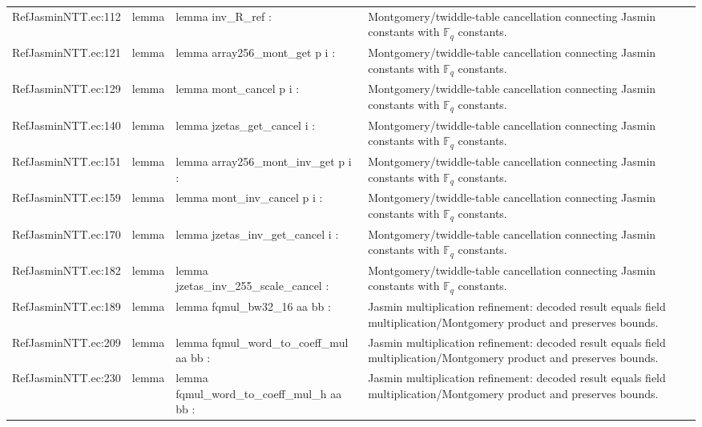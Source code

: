 \documentclass[10pt]{article}
\begin{document}
\begin{longtable}{L{0.11\textwidth}L{0.05\textwidth}L{0.38\textwidth}L{0.42\textwidth}}
RefJasminNTT.\allowbreak{}ec:\allowbreak{}112 & lemma & {\ttfamily\scriptsize lemma inv\_R\_ref :} & Montgomery/twiddle-table cancellation connecting Jasmin constants with $\mathbb F_q$ constants. \\
RefJasminNTT.\allowbreak{}ec:\allowbreak{}121 & lemma & {\ttfamily\scriptsize lemma array256\_mont\_get p i :} & Montgomery/twiddle-table cancellation connecting Jasmin constants with $\mathbb F_q$ constants. \\
RefJasminNTT.\allowbreak{}ec:\allowbreak{}129 & lemma & {\ttfamily\scriptsize lemma mont\_cancel p i :} & Montgomery/twiddle-table cancellation connecting Jasmin constants with $\mathbb F_q$ constants. \\
RefJasminNTT.\allowbreak{}ec:\allowbreak{}140 & lemma & {\ttfamily\scriptsize lemma jzetas\_get\_cancel i :} & Montgomery/twiddle-table cancellation connecting Jasmin constants with $\mathbb F_q$ constants. \\
RefJasminNTT.\allowbreak{}ec:\allowbreak{}151 & lemma & {\ttfamily\scriptsize lemma array256\_mont\_inv\_get p i :} & Montgomery/twiddle-table cancellation connecting Jasmin constants with $\mathbb F_q$ constants. \\
RefJasminNTT.\allowbreak{}ec:\allowbreak{}159 & lemma & {\ttfamily\scriptsize lemma mont\_inv\_cancel p i :} & Montgomery/twiddle-table cancellation connecting Jasmin constants with $\mathbb F_q$ constants. \\
RefJasminNTT.\allowbreak{}ec:\allowbreak{}170 & lemma & {\ttfamily\scriptsize lemma jzetas\_inv\_get\_cancel i :} & Montgomery/twiddle-table cancellation connecting Jasmin constants with $\mathbb F_q$ constants. \\
RefJasminNTT.\allowbreak{}ec:\allowbreak{}182 & lemma & {\ttfamily\scriptsize lemma jzetas\_inv\_255\_scale\_cancel :} & Montgomery/twiddle-table cancellation connecting Jasmin constants with $\mathbb F_q$ constants. \\
RefJasminNTT.\allowbreak{}ec:\allowbreak{}189 & lemma & {\ttfamily\scriptsize lemma fqmul\_bw32\_16 aa bb :} & Jasmin multiplication refinement: decoded result equals field multiplication/Montgomery product and preserves bounds. \\
RefJasminNTT.\allowbreak{}ec:\allowbreak{}209 & lemma & {\ttfamily\scriptsize lemma fqmul\_word\_to\_coeff\_mul aa bb :} & Jasmin multiplication refinement: decoded result equals field multiplication/Montgomery product and preserves bounds. \\
RefJasminNTT.\allowbreak{}ec:\allowbreak{}230 & lemma & {\ttfamily\scriptsize lemma fqmul\_word\_to\_coeff\_mul\_h aa bb :} & Jasmin multiplication refinement: decoded result equals field multiplication/Montgomery product and preserves bounds. \\

\end{longtable}
\end{document}
